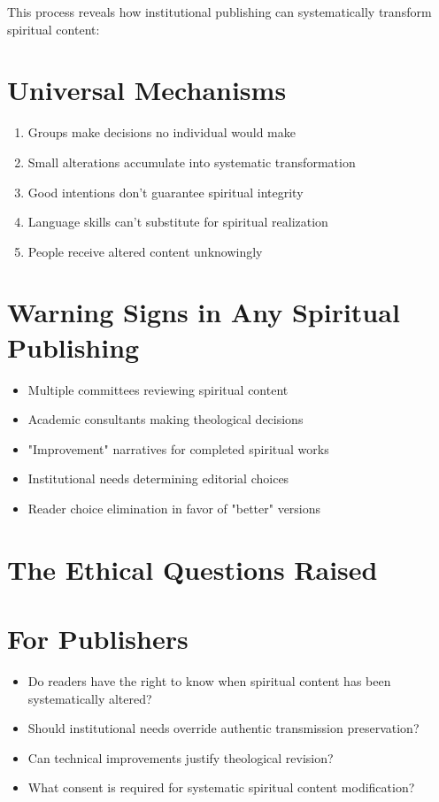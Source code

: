 \documentclass[11pt,twoside]{book}
\begin{document}
This process reveals how institutional publishing can systematically transform spiritual content:
\section*{Universal Mechanisms}
\label{sec:org457660e}
\begin{enumerate}
\item Groups make decisions no individual would make
\item Small alterations accumulate into systematic transformation
\item Good intentions don't guarantee spiritual integrity
\item Language skills can't substitute for spiritual realization
\item People receive altered content unknowingly
\end{enumerate}
\section*{Warning Signs in Any Spiritual Publishing}
\label{sec:org01e3ed7}
\begin{itemize}
\item Multiple committees reviewing spiritual content
\item Academic consultants making theological decisions
\item "Improvement" narratives for completed spiritual works
\item Institutional needs determining editorial choices
\item Reader choice elimination in favor of "better" versions
\end{itemize}
\section*{The Ethical Questions Raised}
\label{sec:org0a9f78d}

\section*{For Publishers}
\label{sec:org3a4ed76}
\begin{itemize}
\item Do readers have the right to know when spiritual content has been systematically altered?
\item Should institutional needs override authentic transmission preservation?
\item Can technical improvements justify theological revision?
\item What consent is required for systematic spiritual content modification?
\end{itemize}
\end{document}
